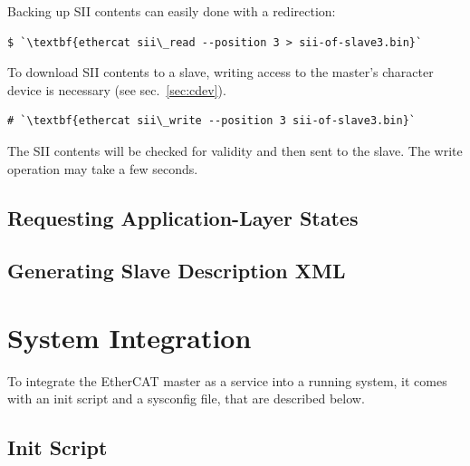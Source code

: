 \documentclass[a4paper,12pt,BCOR6mm,bibtotoc,idxtotoc]{scrbook}
\begin{document}
Backing up SII contents can easily done with a redirection:

\begin{lstlisting}
$ `\textbf{ethercat sii\_read --position 3 > sii-of-slave3.bin}`
\end{lstlisting}

To download SII contents to a slave, writing access to the master's character
device is necessary (see sec.~\ref{sec:cdev}).



\begin{lstlisting}
# `\textbf{ethercat sii\_write --position 3 sii-of-slave3.bin}`
\end{lstlisting}

The SII contents will be checked for validity and then sent to the slave. The
write operation may take a few seconds.


\subsection{Requesting Application-Layer States}




\subsection{Generating Slave Description XML}




\section{System Integration}
\label{sec:system}

To integrate the EtherCAT master as a service into a running system, it comes
with an init script and a sysconfig file, that are described below.

\subsection{Init Script}
\label{sec:init}
\end{document}
